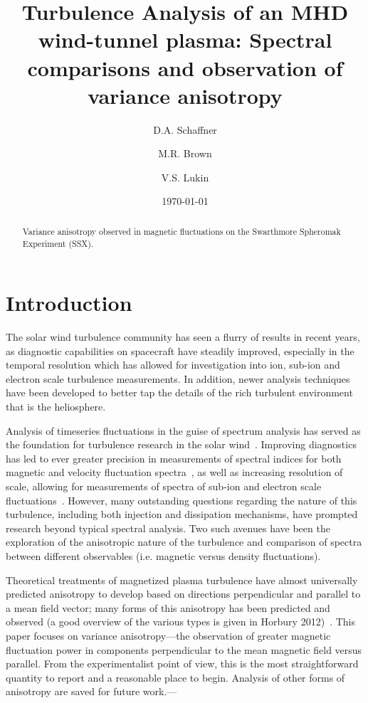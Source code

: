 \documentclass[aip,prl,amsmath,amssymb,reprint,superscriptaddress]{revtex4-1} %
\begin{document}
\title{Turbulence Analysis of an MHD wind-tunnel plasma: Spectral comparisons and observation of variance anisotropy}

\author{D.A. Schaffner}
\author{M.R. Brown}
\author{V.S. Lukin}

\date{\today}
\begin{abstract}
Variance anisotropy observed in magnetic fluctuations on the Swarthmore Spheromak Experiment (SSX).
\end{abstract}

\maketitle

\section{Introduction}

The solar wind turbulence community has seen a flurry of results in recent years, as diagnostic capabilities on spacecraft have steadily improved, especially in the temporal resolution which has allowed for investigation into ion, sub-ion and electron scale turbulence measurements. In addition, newer analysis techniques have been developed to better tap the details of the rich turbulent environment that is the heliosphere. 

Analysis of timeseries fluctuations in the guise of spectrum analysis has served as the foundation for turbulence research in the solar wind~\cite{goldstein95,tumarsch95}. Improving diagnostics has led to ever greater precision in measurements of spectral indices for both magnetic and velocity fluctuation spectra~\cite{podesta07}, as well as increasing resolution of scale, allowing for measurements of spectra of sub-ion and electron scale fluctuations~\cite{alexandrova09,sahraoui09}. However, many outstanding questions regarding the nature of this turbulence, including both injection and dissipation mechanisms, have prompted research beyond typical spectral analysis. Two such avenues have been the exploration of the anisotropic nature of the turbulence and comparison of spectra between different observables (i.e. magnetic versus density fluctuations).

Theoretical treatments of magnetized plasma turbulence have almost universally predicted anisotropy to develop based on directions perpendicular and parallel to a mean field vector; many forms of this anisotropy has been predicted and observed (a good overview of the various types is given in Horbury 2012)~\cite{horbury12}. This paper focuses on variance anisotropy---the observation of greater magnetic fluctuation power in components perpendicular to the mean magnetic field versus parallel. From the experimentalist point of view, this is the most straightforward quantity to report and a reasonable place to begin. Analysis of other forms of anisotropy are saved for future work.---%
\end{document}
